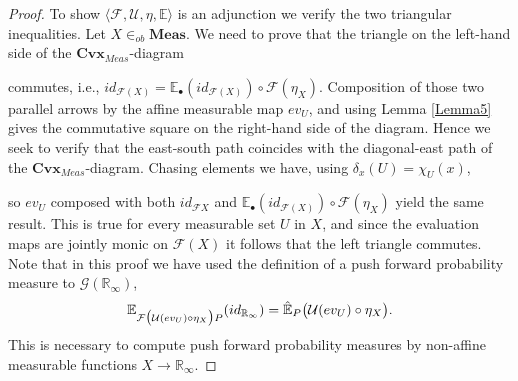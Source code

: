 \documentclass[10pt,a4paper]{amsart}
\newcommand{\Rinf}{\mathbb{R}_{\infty}}
\newcommand{\G}{\mathcal{G}}
\begin{document}
\begin{proof}  To show  $\langle \mathcal{F}, \mathcal{U}, \eta, \mathbb{E} \rangle$ is an adjunction
we verify the two triangular inequalities.  Let $X \in_{ob} \mathbf{Meas}$.   We need to prove that the triangle on the left-hand side of the $\mathbf{Cvx}_{Meas}$-diagram
\begin{center}
\end{center}
commutes, i.e., $id_{\mathcal{F}(X)} = \mathbb{E}_{\bullet}(id_{\mathcal{F}(X)}) \circ \mathcal{F}(\eta_X)$.
Composition of those two parallel arrows by the affine measurable map $ev_U$, and using Lemma \ref{Lemma5} gives the commutative square on the right-hand side of the diagram.    Hence we seek to verify that the east-south path coincides with the diagonal-east path of the $\mathbf{Cvx}_{Meas}$-diagram.  Chasing elements we have, using $\delta_x(U)=\chi_U(x)$, 
\begin{center}
\end{center}
so $ev_U$ composed with both $id_{\mathcal{F}X}$ and $\mathbb{E}_{\bullet}(id_{\mathcal{F}(X)}) \circ \mathcal{F}(\eta_X)$ yield the same result.  This is true for every measurable set $U$ in $X$, and since the evaluation maps are jointly monic on $\mathcal{F}(X)$ it follows that the left triangle commutes.  Note that in this proof we have used the definition of a push forward probability measure to $\G(\Rinf)$, 
$$
\mathbb{E}_{\mathcal{F}\big( \mathcal{U}(ev_{\small{U}}) \circ \eta_X\big)P}(id_{\Rinf}) = \hat{\mathbb{E}}_P\big( \mathcal{U}(ev_{\tiny{U}}) \circ \eta_X\big).
$$
This is necessary to compute push forward probability measures by non-affine measurable functions $X \rightarrow \Rinf$.


\end{proof}
\end{document}
